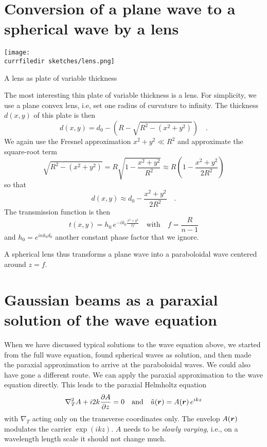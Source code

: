 \section{Conversion of a plane wave to a spherical wave by a lens}

\begin{marginfigure}
    \texttt{[image: \\currfiledir sketches/lens.png]}
   \caption{A lens as plate of variable thickness}
\end{marginfigure}

The most interesting thin plate of variable thickness is a lens. For simplicity, we use a plane convex lens, i.e, set one radius of curvature to infinity. The thickness $d(x,y)$ of this plate is then
\begin{equation}
    d(x,y) = d_0 - \left( R - \sqrt{R^2 - (x^2 + y^2)} \right) \quad .
\end{equation}
We again use the Fresnel approximation $x^2 + y^2 \ll R^2$ and approximate the square-root term
\begin{equation}
    \sqrt{R^2 - (x^2 + y^2)}  = R \sqrt{1- \frac{x^2 + y^2}{R^2}} 
    \approx R \left( 1 -  \frac{x^2 + y^2}{2 R^2} \right)
\end{equation}
so that 
\begin{equation}
    d(x,y) \approx d_0 -  \frac{x^2 + y^2}{2 R^2} \quad .
\end{equation}
The transmission function is then
\begin{equation}
    t(x,y)= h_0 \,  e^{-i k_0 \frac{x^2 + y^2}{2f}}
    \quad 
    \text{with} \quad
    f = \frac{R}{n-1}
    \label{eq:2_phase_of_lens}
\end{equation}
and $h_0 = e^{i n k_0 d_0}$ another constant phase factor that we ignore.

A spherical lens thus transforms a plane wave into a paraboloidal wave centered around $z=f$.


\section{Gaussian beams as a paraxial solution of the wave equation}

When we have discussed typical solutions to the wave equation above, we started from the full wave equation, found spherical waves as solution, and then made the paraxial approximation to arrive at the paraboloidal waves. We could also have gone a different route. We can apply the paraxial approximation to the wave equation directly. This leads to the paraxial Helmholtz equation
\begin{equation}
    \nabla_T^2 A + i 2k \frac{\partial A}{\partial z} = 0
    \quad 
    \text{and}
    \quad
    \tilde{u}(\boldsymbol{r}) = A(\boldsymbol{r}) \, e^{i k z}
\end{equation}
with $ \nabla_T$ acting only on the transverse coordinates only. The envelop $ A(\boldsymbol{r})$ modulates the carrier $\exp(i k z)$. $A$ needs to be \emph{slowly varying}, i.e., on a wavelength length scale it should not change much.

